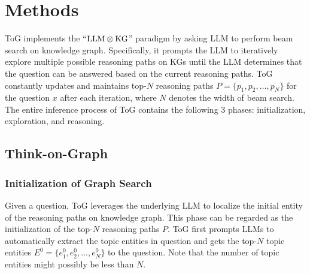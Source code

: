 \documentclass{article} %
\begin{document}
\section{Methods}
\label{sec: methods} 
ToG implements the ``$\hbox{LLM}\otimes \hbox{KG}$'' paradigm by asking LLM to perform beam search on knowledge graph. Specifically, it prompts the LLM to iteratively explore multiple possible reasoning paths on KGs until the LLM determines that the question can be answered based on the current reasoning paths. ToG constantly updates and maintains top-$N$ reasoning paths $P=\{p_1,p_2,\ldots, p_N\}$ for the question $x$ after each iteration, where $N$ denotes the width of beam search.
The entire inference process of ToG contains the following 3 phases: initialization, exploration, and reasoning. 

\subsection{Think-on-Graph}

\subsubsection{Initialization of Graph Search}
Given a question, ToG leverages the underlying LLM to localize the initial entity of the reasoning paths on knowledge graph. This phase can be regarded as the initialization of the top-$N$ reasoning paths $P$. ToG first prompts LLMs to automatically extract the topic entities in question and gets the top-$N$ topic entities $E^{0}=\{e^{0}_{1},e^{0}_{2},...,e^{0}_{N}\}$ to the question. Note that the number of topic entities might possibly be less than $N$.
\end{document}
